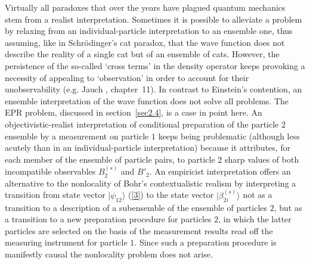 \documentclass[12pt]{article}
\begin{document}
Virtually all paradoxes that over the years have plagued quantum
mechanics stem from a realist interpretation. Sometimes it is
possible to alleviate a problem by relaxing from an
individual-particle interpretation to an ensemble one, thus
assuming, like in Schr\"odinger's cat paradox, that the wave
function does not describe the reality of a single cat but of an
ensemble of cats. However, the persistence of the so-called `cross
terms' in the density operator keeps provoking a necessity of
appealing to `observation' in order to account for their
unobservability (e.g. Jauch \cite{Jauch}, chapter~11). In contrast
to Einstein's contention, an ensemble interpretation of the wave
function does not solve all problems. The EPR problem, discussed
in section~\ref{sec2.4}, is a case in point here. An
objectivistic-realist interpretation of conditional preparation of
the particle $2$ ensemble by a measurement on particle $1$ keeps
being problematic (although less acutely than in an
individual-particle interpretation) because it attributes, for
each member of the ensemble of particle pairs, to particle $2$
sharp values of both incompatible observables $B^{(s)}_2$ and
$B'_2$. An empiricist interpretation offers an alternative to the
nonlocality of Bohr's contextualistic realism by interpreting a
transition from state vector $|\psi_{12}\rangle$ (\ref{3}) to the
state vector $|\beta^{(s)}_{2i}\rangle$ not as a transition to a
description of a subensemble of the ensemble of particles $2$, but
as a transition to a new preparation procedure for particles $2$,
in which the latter particles are selected on the basis of the
measurement results read off the measuring instrument for particle
$1$. Since such a preparation procedure is manifestly causal the
nonlocality problem does not arise.
\end{document}
